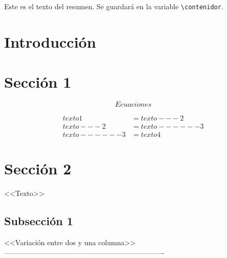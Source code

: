 \documentclass[letterpaper,11pt]{article}
\begin{document}


%

\begin{resumen}
    Este es el texto del resumen. Se guardará en la variable \texttt{\textbackslash contenidor}.
\end{resumen}

\begin{multicols}{2}

\section{Introducción}

\section{Sección 1} 

\begin{equation}
    Ecuaciones
\label{ecuacion}
\end{equation}

\begin{equation*} %
\begin{split}
    texto1 & = texto---2 \\
    texto---2 & = texto------3 \\
    texto------3 & = texto4
\end{split}
\end{equation*}

\section{Sección 2}

<<Texto>>

\end{multicols}

\subsection{Subsección 1}

<<Variación entre dos y una columna>> -------------------------------------------------------------------
\end{document}
